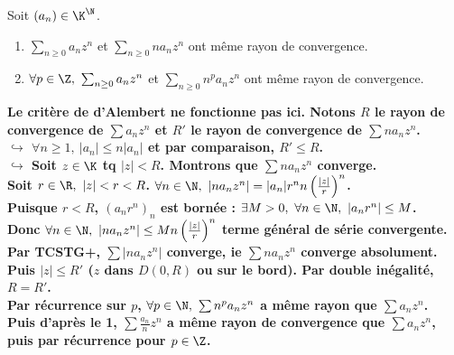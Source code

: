 \documentclass[11pt]{article}
\begin{document}
\begin{lemme}{}{}
    Soit $(a_n)\in\K^\N$.
    \begin{enumerate}
        \item $\sum_{n\geq0}a_nz^n$ et $\sum_{n\geq0}na_nz^n$ ont même rayon de convergence.
        \item $\forall p \in \Z, ~ \sum_{n\geq0}a_nz^n$ et $\sum_{n\geq0}n^pa_nz^n$ ont même rayon de convergence.
    \end{enumerate}
    \bf{Le critère de d'Alembert ne fonctionne pas ici.}
    \tcblower
     Notons $R$ le rayon de convergence de $\sum a_nz^n$ et $R'$ le rayon de convergence de $\sum na_nz^n$.\\
    $\hookrightarrow$ $\forall n \geq 1, ~ |a_n|\leq n|a_n|$ et par comparaison, $R'\leq R$.\\
    $\hookrightarrow$ Soit $z\in\K$ tq $|z|<R$. Montrons que $\sum na_nz^n$ converge.\\
    Soit $r\in \R, ~ |z|<r<R$. $\forall n \in \N, ~ |na_nz^n|=|a_n|r^nn\left( \frac{|z|}{r} \right)^n$.\\
    Puisque $r<R$, $(a_nr^n)_n$ est bornée : $\exists M > 0, ~ \forall n \in \N, ~ |a_nr^n|\leq M$.\\
    Donc $\forall n \in \N, ~ |na_nz^n|\leq M n\left( \frac{|z|}{r} \right)^n$ terme général de série convergente.\\
    Par TCSTG+, $\sum|na_nz^n|$ converge, ie $\sum na_nz^n$ converge absolument.\\ 
    Puis $|z|\leq R'$ ($z$ dans $D(0,R)$ ou sur le bord). Par double inégalité, $R=R'$.\\
     Par récurrence sur $p$, $\forall p \in \N, ~ \sum n^pa_nz^n$ a même rayon que $\sum a_nz^n$.\\
    Puis d'après le 1, $\sum \frac{a_n}{n}z^n$ a même rayon de convergence que $\sum a_nz^n$, puis par récurrence pour $p\in \Z$.
\end{lemme}

\pagebreak
\end{document}
